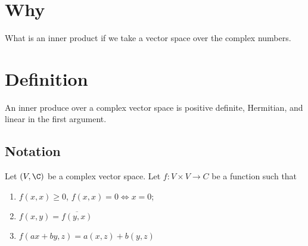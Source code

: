 

\section*{Why}

What is an inner product if we take a vector space over the complex numbers.

\section*{Definition}

An inner produce over a complex vector space is positive definite, Hermitian, and linear in the first argument.

\subsection*{Notation}

Let $(V, \C )$ be a complex vector space.
Let $f: V \times V \to C$ be a function such that
    \begin{enumerate}
      \item $f(x, x) \geq 0$, $f(x, x) = 0 \Leftrightarrow x = 0$;
      \item $f(x, y) = \overline{f(y, x)}$
      \item $f(ax + by, z) = a(x, z) + b(y, z)$
    \end{enumerate}
